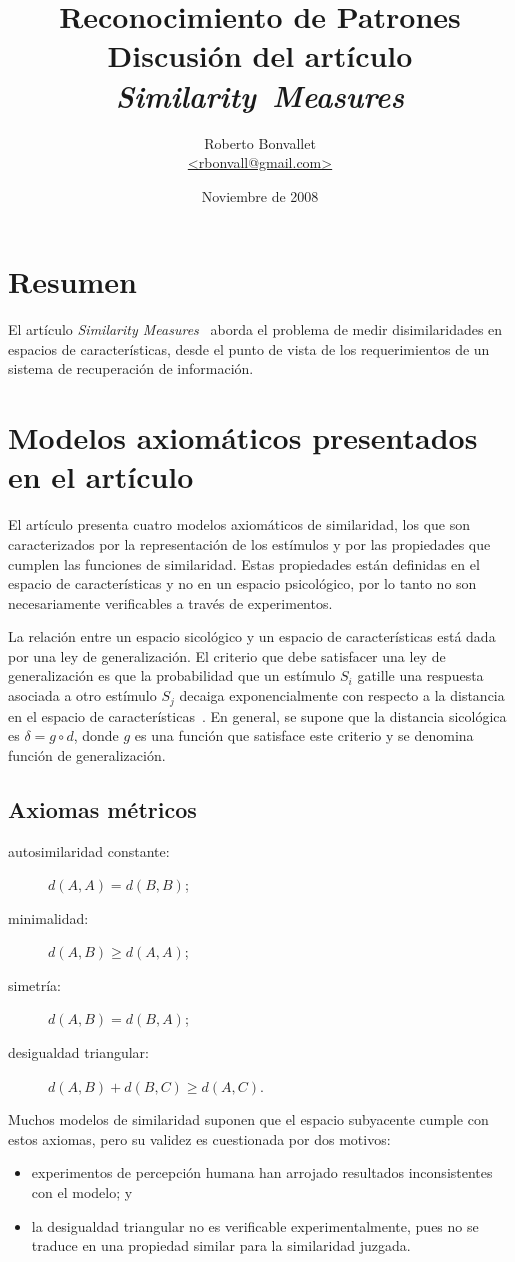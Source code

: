 \documentclass[spanish]{article}
\title{Reconocimiento de Patrones\\Discusión del artículo \textit{Similarity~Measures}}
\author{Roberto Bonvallet \\ \url {<rbonvall@gmail.com>}}
\date{Noviembre de 2008}
\begin{document}
\maketitle

\section{Resumen}
El artículo \textit{Similarity Measures}~\cite{sim} aborda el problema de medir
disimilaridades en espacios de características, desde el punto de vista de los
requerimientos de un sistema de recuperación de información.


\section{Modelos axiomáticos presentados en el artículo}
El artículo presenta cuatro modelos axiomáticos de similaridad, los que son caracterizados por 
la representación de los estímulos y por las propiedades que cumplen las funciones de similaridad.
Estas propiedades están definidas en el espacio de características y no en un espacio psicológico,
por lo tanto no son necesariamente verificables a través de experimentos.

La relación entre un espacio sicológico y un espacio de características está dada por una ley de
generalización.  El criterio que debe satisfacer una ley de generalización es que la probabilidad
que un estímulo $S_i$ gatille una respuesta asociada a otro estímulo $S_j$ decaiga exponencialmente
con respecto a la distancia en el espacio de características~\cite{shepard}.  En general, se supone
que la distancia sicológica es $\delta = g\circ d$, donde $g$ es una función que satisface este
criterio y se denomina función de generalización.

\subsection{Axiomas métricos}

\begin{description}
    \item [autosimilaridad constante:]
        $d(A, A) = d(B, B)$;
    \item [minimalidad:]
        $d(A, B)\ge d(A, A)$;
    \item [simetría:]
        $d(A, B) = d(B, A)$;
    \item [desigualdad triangular:]
        $d(A, B) + d(B, C)\ge d(A, C)$.
\end{description}
Muchos modelos de similaridad suponen que el espacio subyacente cumple con estos axiomas,
pero su validez es cuestionada por dos motivos:
\begin{itemize}
    \item experimentos de percepción humana han arrojado resultados
        inconsistentes con el modelo; y
    \item la desigualdad triangular no es verificable experimentalmente,
        pues no se traduce en una propiedad similar para la similaridad juzgada.
\end{itemize}
\end{document}
